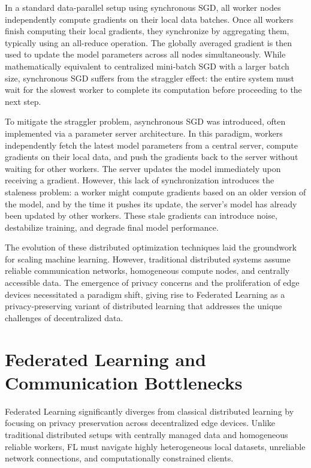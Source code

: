 In a standard data-parallel setup using synchronous SGD, all worker nodes independently compute gradients on their local data batches. Once all workers finish computing their local gradients, they synchronize by aggregating them, typically using an all-reduce operation. The globally averaged gradient is then used to update the model parameters across all nodes simultaneously. While mathematically equivalent to centralized mini-batch SGD with a larger batch size, synchronous SGD suffers from the straggler effect: the entire system must wait for the slowest worker to complete its computation before proceeding to the next step.

To mitigate the straggler problem, asynchronous SGD was introduced, often implemented via a parameter server architecture. In this paradigm, workers independently fetch the latest model parameters from a central server, compute gradients on their local data, and push the gradients back to the server without waiting for other workers. The server updates the model immediately upon receiving a gradient. However, this lack of synchronization introduces the staleness problem: a worker might compute gradients based on an older version of the model, and by the time it pushes its update, the server's model has already been updated by other workers. These stale gradients can introduce noise, destabilize training, and degrade final model performance.


The evolution of these distributed optimization techniques laid the groundwork for scaling machine learning. However, traditional distributed systems assume reliable communication networks, homogeneous compute nodes, and centrally accessible data. The emergence of privacy concerns and the proliferation of edge devices necessitated a paradigm shift, giving rise to Federated Learning as a privacy-preserving variant of distributed learning that addresses the unique challenges of decentralized data.

\section{Federated Learning and Communication Bottlenecks}

Federated Learning significantly diverges from classical distributed learning by focusing on privacy preservation across decentralized edge devices. Unlike traditional distributed setups with centrally managed data and homogeneous reliable workers, FL must navigate highly heterogeneous local datasets, unreliable network connections, and computationally constrained clients.

